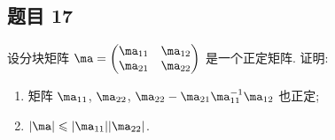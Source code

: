 \subsection*{ 题目 17 }
\begin{problem*}
设分块矩阵 $\ma = \begin{pmatrix}
    \ma_{11} & \ma_{12} \\
    \ma_{21} & \ma_{22}
\end{pmatrix}$ 是一个正定矩阵. 证明:
\begin{enumerate}
    \item 矩阵 $\ma_{11}$, $\ma_{22}$, $\ma_{22} - \ma_{21}\ma_{11}^{-1}\ma_{12}$ 也正定;
    \item\label{enum::0} $|\ma| \leqslant |\ma_{11}||\ma_{22}|$.
\end{enumerate}
\end{problem*}
